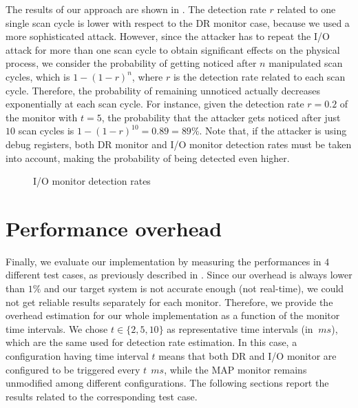 The results of our approach are shown in .
The detection rate $r$ related to one single scan cycle is lower with respect to the DR monitor case, because we used a more sophisticated attack.
However, since the attacker has to repeat the I/O attack for more than one scan cycle to obtain significant effects on the physical process,
we consider the probability of getting noticed after $n$ manipulated scan cycles, which is $1 - (1 - r)^{n}$, where $r$ is the detection rate related to each scan cycle.
Therefore, the probability of remaining unnoticed actually decreases exponentially at each scan cycle.
For instance, given the detection rate $r = 0.2$ of the monitor with $t = 5$, the probability that the attacker
gets noticed after just $10$ scan cycles is $1 - (1 - r)^{10} = 0.89 = 89\%$.
Note that, if the attacker is using debug registers, both DR monitor and I/O monitor detection rates must be taken into account,
making the probability of being detected even higher.
\begin{figure}[h]
\centering
{}
\caption{I/O monitor detection rates}
\label{fig:io-rates}
\end{figure}


\section{Performance overhead}
\label{sec:overhead}

Finally, we evaluate our implementation by measuring the performances in $4$ different test cases, as previously described in .
Since our overhead is always lower than $1\%$ and our target system is not accurate enough (not real-time),
we could not get reliable results separately for each monitor. Therefore, we provide the overhead estimation for our whole implementation as a function of the monitor time intervals.
We chose $t \in \{2,5,10\}$ as representative time intervals (in $\SI{}{ms}$), which are the same used for detection rate estimation.
In this case, a configuration having time interval $t$ means that both DR and I/O monitor are configured to be triggered every $t~\SI{}{ms}$,
while the MAP monitor remains unmodified among different configurations. The following sections report the results related to the corresponding test case.

